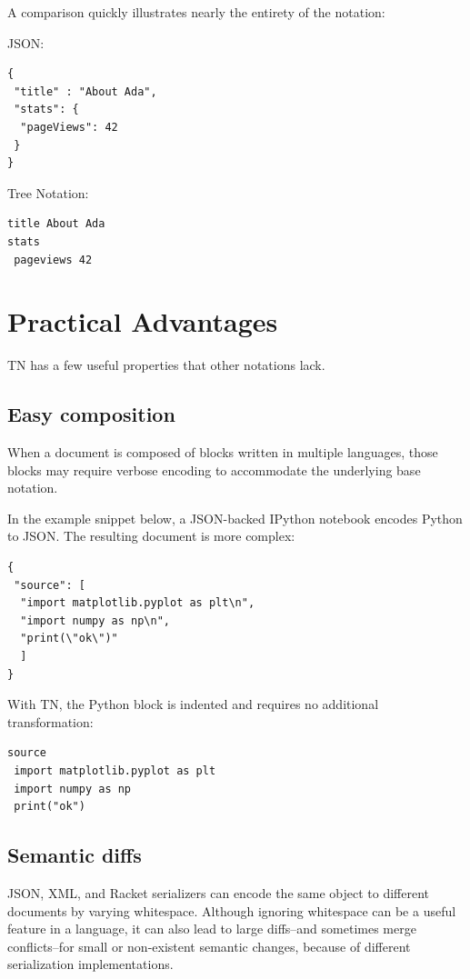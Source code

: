 \documentclass[journal]{IEEEtran}
\begin{document}
A comparison quickly illustrates nearly the entirety of the notation:

JSON:

\begin{lstlisting}
{
 "title" : "About Ada",
 "stats": {
  "pageViews": 42
 }
}
\end{lstlisting}

Tree Notation:

\begin{lstlisting}
title About Ada
stats
 pageviews 42
\end{lstlisting}

\section{Practical Advantages}

TN has a few useful properties that other notations lack.

\subsection{Easy composition}

When a document is composed of blocks written in multiple languages, those blocks may require verbose encoding to accommodate the underlying base notation.

In the example snippet below, a JSON-backed IPython notebook encodes Python to JSON. The resulting document is more complex:

\begin{lstlisting}
{
 "source": [
  "import matplotlib.pyplot as plt\n",
  "import numpy as np\n",
  "print(\"ok\")"
  ]
}
\end{lstlisting}

With TN, the Python block is indented and requires no additional transformation:

\begin{lstlisting}
source
 import matplotlib.pyplot as plt
 import numpy as np
 print("ok")
\end{lstlisting}

\subsection{Semantic diffs}

JSON, XML, and Racket serializers can encode the same object to different documents by varying whitespace. Although ignoring whitespace can be a useful feature in a language, it can also lead to large diffs--and sometimes merge conflicts--for small or non-existent semantic changes, because of different serialization implementations.
\end{document}
